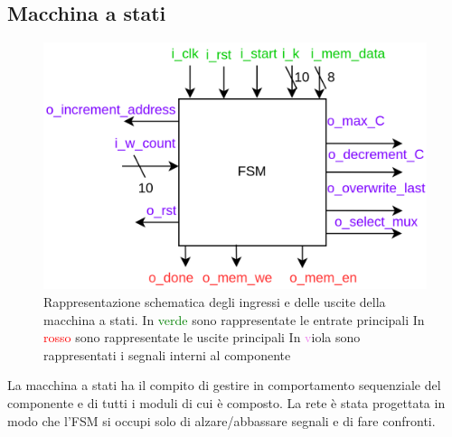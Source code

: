 \documentclass[12pt,a4paper]{scrartcl}
\begin{document}
    \subsection{Macchina a stati}
        \begin{figure}[htbp]
          \centering
          \includegraphics[width=0.9\linewidth]{schema-fsm.drawio.png}
          \caption{Rappresentazione schematica degli ingressi e delle uscite della macchina a stati.
          \newline In \textcolor{green}{verde} sono rappresentate le entrate principali
          \newline In \textcolor{red}{rosso} sono rappresentate le uscite principali
          \newline In \textcolor{violet} viola sono rappresentati i segnali interni al componente}
          \label{fig:componente}
        \end{figure}
        La macchina a stati ha il compito di gestire in comportamento sequenziale del componente e di tutti i moduli di cui è composto. 
        \newline La rete è stata progettata in modo che l'FSM si occupi solo di alzare/abbassare segnali e di fare confronti.
        \newpage
\end{document}
